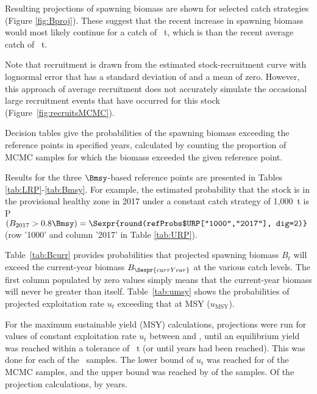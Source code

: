 Resulting projections of spawning biomass are shown for selected catch strategies (Figure \ref{fig:Bproj}). These suggest that the recent increase in spawning biomass would most likely continue for a catch of ~t, which is  than the recent average catch of ~t. 

Note that recruitment is drawn from the estimated stock-recruitment curve with lognormal error that has a standard deviation of  and a mean of zero. However, this approach of average recruitment does not accurately simulate the occasional large recruitment events that have occurred for this stock (Figure~\ref{fig:recruitsMCMC}).

Decision tables give the probabilities of the spawning biomass exceeding the reference points in specified years, calculated by counting the proportion of MCMC samples for which the biomass exceeded the given reference point.

Results for the three $\Bmsy$-based reference points are presented in Tables \ref{tab:LRP}-\ref{tab:Bmsy}. For example, the estimated probability that the stock is in the provisional healthy zone in 2017 under a constant catch strategy of 1,000~t is P$(B_{2017} > 0.8 \Bmsy)=\Sexpr{round(refProbs$URP["1000","2017"], dig=2)}$ (row '1000' and column '2017' in Table \ref{tab:URP}). 

Table~\ref{tab:Bcurr} provides probabilities that projected spawning biomass $B_t$ will exceed the current-year biomass $B_{\Sexpr{currYear}}$ at the various catch levels. The first column populated by zero values simply means that the current-year biomass will never be greater than itself. Table~\ref{tab:umsy} shows the probabilities of projected exploitation rate $u_t$ exceeding that at MSY ($u_\mathrm{MSY}$).

For the maximum sustainable yield (MSY) calculations, projections were run for  values of constant exploitation rate $u_t$ between  and , until an equilibrium yield was reached within a tolerance of ~t (or until  years had been reached). This was done for each of the \numMCMC~samples.
The lower bound of $u_t$ was reached for  of the MCMC samples, and the upper bound was reached by  of the samples.
Of the  projection calculations,  by  years.

